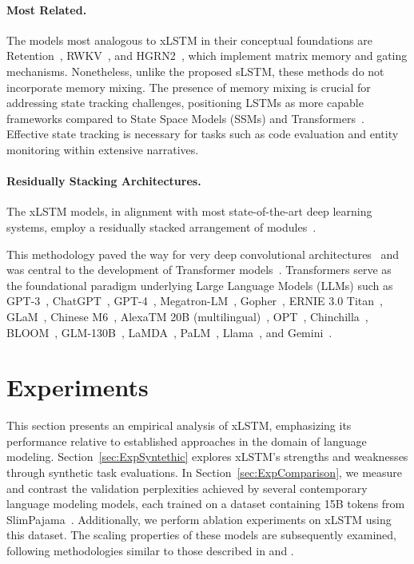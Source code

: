 \paragraph{Most Related.} The models most analogous to xLSTM in their conceptual foundations are Retention~\citep{Sun:23arxiv}, RWKV~\citep{Peng:23arxivshort,Peng:24arxivshort}, and HGRN2~\citep{Qin:24arxiv}, which implement matrix memory and gating mechanisms. Nonetheless, unlike the proposed sLSTM, these methods do not incorporate memory mixing. The presence of memory mixing is crucial for addressing state tracking challenges, positioning LSTMs as more capable frameworks compared to State Space Models (SSMs) and Transformers~\citep{Merrill:24,Deletang:23}. Effective state tracking is necessary for tasks such as code evaluation and entity monitoring within extensive narratives.

\paragraph{Residually Stacking Architectures.} The xLSTM models, in alignment with most state-of-the-art deep learning systems, employ a residually stacked arrangement of modules~\citep{Srivastava:15,He:16}.

This methodology paved the way for very deep convolutional architectures~\citep{He:16} and was central to the development of Transformer models~\citep{Vaswani:17}. Transformers serve as the foundational paradigm underlying Large Language Models (LLMs) such as GPT-3~\citep{Brown:20short}, ChatGPT~\citep{Schulman:22short}, GPT-4~\citep{Achiam:23gpt4short}, Megatron-LM~\citep{Shoeybi:19}, Gopher~\citep{Rae:21short}, ERNIE 3.0 Titan~\citep{Wang:21arxivshort}, GLaM~\citep{Du:21glamshort}, Chinese M6~\citep{Lin:21}, AlexaTM 20B (multilingual)~\citep{Soltan:22}, OPT~\citep{Zhang:22opt}, Chinchilla~\citep{Hoffmann:22short}, BLOOM~\citep{Scao:22arxivshort}, GLM-130B~\citep{Zeng:22arxivshort}, LaMDA~\citep{Thoppilan:22short}, PaLM~\citep{Chowdhery:22short}, Llama~\citep{Touvron:23arxiv}, and Gemini~\citep{GeminiTeam:23arxiv,Reid:24arxiv}.

\section{Experiments}
\label{sec:Exp}

This section presents an empirical analysis of xLSTM, emphasizing its performance relative to established approaches in the domain of language modeling. Section~\ref{sec:ExpSyntethic} explores xLSTM's strengths and weaknesses through synthetic task evaluations. In Section~\ref{sec:ExpComparison}, we measure and contrast the validation perplexities achieved by several contemporary language modeling models, each trained on a dataset containing 15B tokens from SlimPajama~\citep{Soboleva:23}. Additionally, we perform ablation experiments on xLSTM using this dataset. The scaling properties of these models are subsequently examined, following methodologies similar to those described in \citet{Kaplan:20} and \citet{Brown:20short}.

